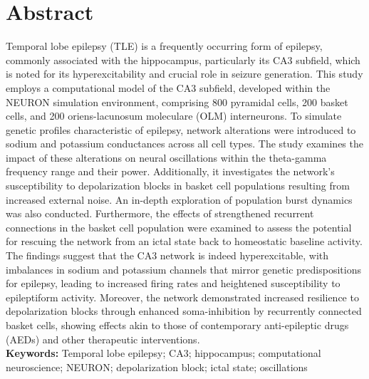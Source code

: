 \section*{Abstract}
Temporal lobe epilepsy (TLE) is a frequently occurring form of epilepsy, commonly
associated with the hippocampus, particularly its CA3 subfield, which is noted
for its hyperexcitability and crucial role in seizure generation. This study
employs a computational model of the CA3 subfield, developed within the NEURON
simulation environment, comprising 800 pyramidal cells, 200 basket cells, and 200
oriens-lacunosum moleculare (OLM) interneurons. To simulate genetic profiles
characteristic of epilepsy, network alterations were introduced to sodium and
potassium conductances across all cell types. The study examines the impact of
these alterations on neural oscillations within the theta-gamma frequency range
and their power. Additionally, it investigates the network's susceptibility to
depolarization blocks in basket cell populations resulting from increased external
noise. An in-depth exploration of population burst dynamics was also conducted.
Furthermore, the effects of strengthened recurrent connections in the basket cell
population were examined to assess the potential for rescuing the network from an
ictal state back to homeostatic baseline activity. The findings suggest that the
CA3 network is indeed hyperexcitable, with imbalances in sodium and potassium
channels that mirror genetic predispositions for epilepsy, leading to increased
firing rates and heightened susceptibility to epileptiform activity. Moreover, the
network demonstrated increased resilience to depolarization blocks through enhanced
soma-inhibition by recurrently connected basket cells, showing effects akin to
those of contemporary anti-epileptic drugs (AEDs) and other therapeutic interventions.\\

\noindent
\textbf{Keywords:} Temporal lobe epilepsy; CA3; hippocampus; computational neuroscience; NEURON\@;
depolarization block; ictal state; oscillations